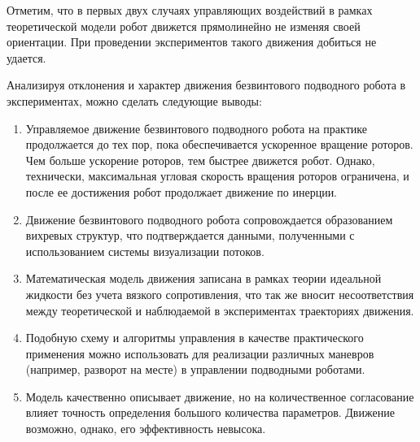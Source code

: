 Отметим, что в первых двух случаях управляющих воздействий в рамках теоретической модели робот движется прямолинейно не изменяя своей ориентации. При проведении экспериментов такого движения добиться не удается.

Анализируя отклонения и характер движения безвинтового подводного робота в экспериментах, можно сделать следующие выводы:

\begin{enumerate}
	\item	Управляемое движение безвинтового подводного робота на практике продолжается до тех пор, пока обеспечивается ускоренное вращение роторов. Чем больше ускорение роторов, тем быстрее движется робот. Однако, технически, максимальная угловая скорость вращения роторов ограничена, и после ее достижения робот продолжает движение по инерции.
	\item	Движение безвинтового подводного робота сопровождается образованием вихревых структур, что подтверждается данными, полученными с использованием системы визуализации потоков. %
	\item Математическая модель движения записана в рамках теории идеальной жидкости без учета вязкого сопротивления, что так же вносит несоответствия между теоретической и наблюдаемой в экспериментах траекториях движения.
	\item Подобную схему и алгоритмы управления в качестве практического применения можно использовать для реализации различных маневров (например, разворот на месте) в управлении подводными роботами.
	\item Модель качественно описывает движение, но на количественное согласование влияет точность определения большого количества параметров. Движение возможно, однако, его эффективность невысока.
	
\end{enumerate}

